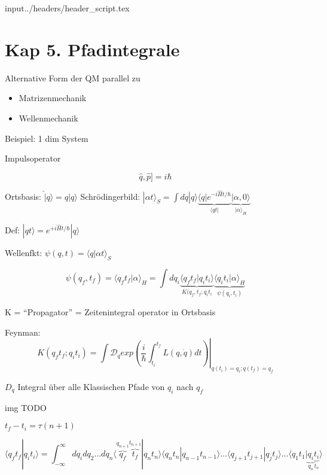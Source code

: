 input{../headers/header_script.tex}



\tableofcontents
\setcounter{chapter}{4}
\chapter*{Kap 5. Pfadintegrale}

Alternative Form der QM parallel zu 

\begin{itemize}
\item Matrizenmechanik
\item Wellenmechanik
\end{itemize}

Beispiel: 1 dim System

Impulsoperator

\[\hat q,\hat p]=i\hbar\]

Ortsbasis: \(\hat |q\rangle =q|q\rangle \)
Schrödingerbild: \(|\alpha t\rangle_S =  \int dq|q\rangle \underbrace{\langle q|e^{-i\hat H t/\hbar}}_{\langle qt|} \underbrace{|\alpha,0\rangle}_{|\alpha\rangle_H} \)

Def: \(|qt\rangle = e^{+i\hat H t/\hbar}|q\rangle \)

Wellenfkt: \(\psi(q,t) = \langle q|\alpha t\rangle_S\)

\[\psi(q_f,t_f) = \langle q_f t_f | \alpha\rangle_H = \int dq_i\underbrace{\langle q_f t_f|q_it_i\rangle }_{K(q_f,t_f;q_it_i}\underbrace{\langle q_it_i|\alpha\rangle_H}_{\psi (q_i,t_i)}\]


K = ``Propagator'' = Zeitenintegral operator in Ortsbasis

Feynman:
\[ K(q_ft_f; q_it_i) = \left.\int\mathcal D_q exp(\frac{i}{\hbar}\int_{t_i}^{t_f}L(q,\dot q)dt)\right|_{q(t_i) = q_i; q(t_f) = q_f}\]

\(D_q\) Integral über alle Klassischen Pfade von \(q_i\) nach \(q_f\)

img TODO

\(t_f-t_i = \tau(n+1)\)

\[ \langle q_ft_f|q_it_i\rangle =\int_{-\infty}^{\infty} dq_idq_2...dq_n\langle \overbrace{q_f}^{q_{n+1}}\overbrace{t_f}^{t_{n+1}}|q_nt_n\rangle \langle q_n t_n|q_{n-1}t_{n-1}\rangle...\langle q_{j+1}t_{j+1}|q_jt_j\rangle ...\langle q_1t_1|\underbrace{q_i}_{q_o}\underbrace{t_i}_{t_o}\rangle  \]

